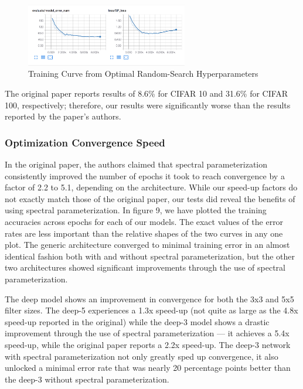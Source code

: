 \documentclass[10pt,journal,compsoc]{IEEEtran}
\begin{document}
\begin{figure}
\centering
  \includegraphics[width=200pt]{images/Training_Curve_10.png}
  \caption{Training Curve from Optimal Random-Search Hyperparameters}
  \label{fig:train_curve}
\end{figure}

The original paper reports results of 8.6\% for CIFAR 10 and 31.6\% for CIFAR 100, respectively; therefore, our results were significantly worse than the results reported by the paper's authors.

\subsubsection{Optimization Convergence Speed}

In the original paper, the authors claimed that spectral parameterization consistently improved the number of epochs it took to reach convergence by a factor of 2.2 to 5.1, depending on the architecture. While our speed-up factors do not exactly match those of the original paper, our tests did reveal the benefits of using spectral parameterization. In figure 9, we have plotted the training accuracies across epochs for each of our models. The exact values of the error rates are less important than the relative shapes of the two curves in any one plot. The generic architecture converged to minimal training error in an almost identical fashion both with and without spectral parameterization, but the other two architectures showed significant improvements through the use of spectral parameterization.

The deep model shows an improvement in convergence for both the 3x3 and 5x5 filter sizes. The deep-5 experiences a 1.3x speed-up (not quite as large as the 4.8x speed-up reported in the original) while the deep-3 model shows a drastic improvement through the use of spectral parameterization — it achieves a 5.4x speed-up, while the original paper reports a 2.2x speed-up. The deep-3 network with spectral parameterization not only greatly sped up convergence, it also unlocked a minimal error rate that was nearly 20 percentage points better than the deep-3 without spectral parameterization.
\end{document}
